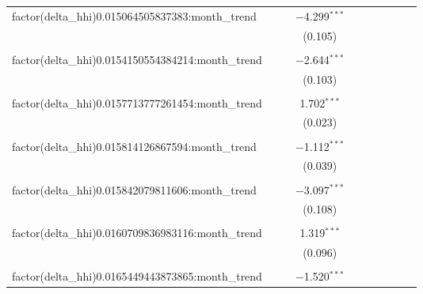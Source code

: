 \begin{table}[H]
{\begin{tabular}{@{\extracolsep{5pt}}lccccccccc}
  factor(delta\_hhi)0.015064505837383:month\_trend &  &  & $-$4.299$^{***}$ &  &  &  &  &  &  \\  

   &  &  & (0.105) &  &  &  &  &  &  \\  

   & & & & & & & & & \\  

  factor(delta\_hhi)0.0154150554384214:month\_trend &  &  & $-$2.644$^{***}$ &  &  &  &  &  &  \\  

   &  &  & (0.103) &  &  &  &  &  &  \\  

   & & & & & & & & & \\  

  factor(delta\_hhi)0.0157713777261454:month\_trend &  &  & 1.702$^{***}$ &  &  &  &  &  &  \\  

   &  &  & (0.023) &  &  &  &  &  &  \\  

   & & & & & & & & & \\  

  factor(delta\_hhi)0.015814126867594:month\_trend &  &  & $-$1.112$^{***}$ &  &  &  &  &  &  \\  

   &  &  & (0.039) &  &  &  &  &  &  \\  

   & & & & & & & & & \\  

  factor(delta\_hhi)0.015842079811606:month\_trend &  &  & $-$3.097$^{***}$ &  &  &  &  &  &  \\  

   &  &  & (0.108) &  &  &  &  &  &  \\  

   & & & & & & & & & \\  

  factor(delta\_hhi)0.0160709836983116:month\_trend &  &  & 1.319$^{***}$ &  &  &  &  &  &  \\  

   &  &  & (0.096) &  &  &  &  &  &  \\  

   & & & & & & & & & \\  

  factor(delta\_hhi)0.0165449443873865:month\_trend &  &  & $-$1.520$^{***}$ &  &  &  &  &  &  \\  


\end{tabular}}
\end{table}
